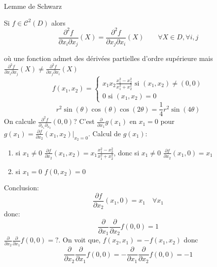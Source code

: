 \documentclass[a4paper]{report}
\theoremstyle{definition}
\begin{document}
\begin{theorem}\label{thm:lemme-de-schwarz}
    Lemme de Schwarz
    \par
    Si $f \in \mathcal{C}^2(D)$ alors 
    \[
        \displaystyle \frac{\partial^2 f}{\partial x_i\partial x_j}(X) = \frac{\partial^2 f}{\partial x_j\partial x_i}(X) \qquad \forall X \in D, \forall i, j
    \] 
\end{theorem}
\begin{eg} où une fonction admet des dérivées partielles d'ordre supérieure mais $\displaystyle \frac{\partial^2 f}{\partial x_i\partial x_j}(X) \neq  \frac{\partial^2 f}{\partial x_j\partial x_i}(X)$
   \[
   f(x_1, x_2) = \begin{cases}
       x_1x_2 \frac{x_1^2 - x_2^2}{x_1^2 + x_2^2} \text{ si } (x_1, x_2) \neq (0, 0)\\
       0 \text{ si } (x_1, x_2) = 0
   \end{cases}
   \]  
   \[
   r^2 \sin(\theta)\cos(\theta)\cos(2\theta) = \frac{1}{4}r^2\sin(4\theta)
   \] 
   On calcule $\displaystyle \frac{\partial^2f}{\partial_{x_1}\partial_{x_2}}(0, 0)$?
       C'est $\displaystyle \frac{\partial}{\partial x_1}g(x_1)$ en $x_1 = 0$ pour $\displaystyle g(x_1) = \frac{\partial f}{\partial x_2}(x_1, x_2)|_{x_2 = 0}$. Calcul de $g(x_1)$:
    \begin{enumerate}
        \item si $x_1 \neq 0$ $\frac{\partial f}{\partial x_2}(x_1, x_2) = x_1 \frac{x_1 ^ 2 - x_2^2}{x_1^2 + x_2^2}$, donc si $x_1 \neq 0$ $\frac{\partial f}{\partial x_2}(x_1, 0) = x_1$ 
        \item si $x_1 = 0$ $f(0, x_2) = 0$
    \end{enumerate}
    Conclusion:
    \[
    \frac{\partial f}{\partial x_2}(x_1, 0) = x_1 \quad \forall x_1
    \] 
    donc: 
    \[
    \frac{\partial}{\partial x_1}\frac{\partial}{\partial x_2}f(0, 0) = 1
    \] 
    $\displaystyle \frac{\partial}{\partial x_2}\frac{\partial}{\partial x_1}f(0, 0) = ?$. On voit que, $f(x_2, x_1) = -f(x_1, x_2)$ donc 
    \[
    \frac{\partial}{\partial x_2}\frac{\partial}{\partial x_1}f(0, 0) = - \frac{\partial}{\partial x_1}\frac{\partial}{\partial x_2}f(0, 0) = -1
    \] 
\end{eg}
\end{document}
